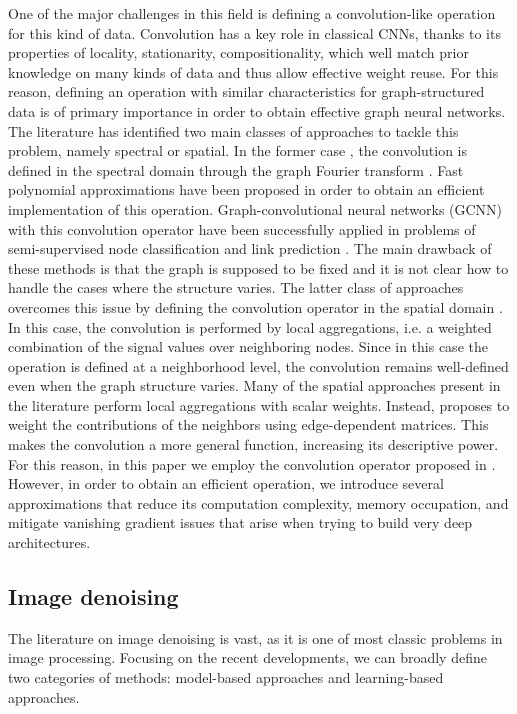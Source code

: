 \documentclass[journal]{IEEEtran}
\begin{document}
One of the major challenges in this field is defining a convolution-like operation for this kind of data. Convolution has a key role in classical CNNs, thanks to its properties of locality, stationarity, compositionality, which well match prior knowledge on many kinds of data and thus allow effective weight reuse. For this reason, defining an operation with similar characteristics for graph-structured data is of primary importance in order to obtain effective graph neural networks. The literature has identified two main classes of approaches to tackle this problem, namely spectral or spatial. In the former case \cite{henaff2015deep,defferrard2016convolutional,kipf2016semi}, the convolution is defined in the spectral domain through the graph Fourier transform \cite{shuman2013emerging}. Fast polynomial approximations \cite{defferrard2016convolutional} have been proposed in order to obtain an efficient implementation of this operation. Graph-convolutional neural networks (GCNN) with this convolution operator have been successfully applied in problems of semi-supervised node classification and link prediction \cite{kipf2016semi,schlichtkrull2018modeling}. The main drawback of these methods is that the graph is supposed to be fixed and it is not clear how to handle the cases where the structure varies. The latter class of approaches overcomes this issue by defining the convolution operator in the spatial domain \cite{simonovsky2017dynamic,wang2018dynamic,xu2018powerful,monti2017geometric,verma2018feastnet,valsesia2019learning}. In this case, the convolution is performed by local aggregations, i.e. a weighted combination of the signal values over neighboring nodes. Since in this case the operation is defined at a neighborhood level, the convolution remains well-defined even when the graph structure varies. Many of the spatial approaches present in the literature \cite{xu2018powerful,monti2017geometric,verma2018feastnet} perform local aggregations with scalar weights. Instead, \cite{simonovsky2017dynamic} proposes to weight the contributions of the neighbors using edge-dependent matrices. This makes the convolution a more general function, increasing its descriptive power. For this reason, in this paper we employ the convolution operator proposed in \cite{simonovsky2017dynamic}. However, in order to obtain an efficient operation, we introduce several approximations that reduce its computation complexity, memory occupation, and mitigate vanishing gradient issues that arise when trying to build very deep architectures.

\subsection{Image denoising}
The literature on image denoising is vast, as it is one of most classic problems in image processing. Focusing on the recent developments, we can broadly define two categories of methods: model-based approaches and learning-based approaches. 
\end{document}
